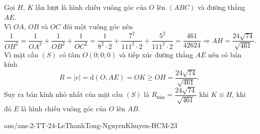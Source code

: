 \begin{ex}
{\noindent Gọi $H$, $K$ lần lượt là hình chiếu vuông góc của $O$ lên $(ABC)$ và đường thẳng $AE$.\\
Vì $OA$, $OB$ và $OC$ đôi một vuông góc nên 
$$ \dfrac{1}{OH^2}=\dfrac{1}{OA^2}+\dfrac{1}{OB^2}+\dfrac{1}{OC^2}=\dfrac{1}{8^2\cdot 2}+\dfrac{7^2}{111^2\cdot 2}+\dfrac{5^2}{111^2\cdot 2}= \dfrac{461}{42624} \Rightarrow AH=\dfrac{24\sqrt{74}}{\sqrt{461}}.$$
Vì mặt cầu $(S)$ có tâm $O(0;0;0)$ và tiếp xúc đường thẳng $AE$ nên có bán kính 
$$ R=|c|=\mathrm{d}(O,AE)=OK \ge OH=\dfrac{24\sqrt{74}}{\sqrt{461}}. $$
Suy ra bán kính nhỏ nhất của mặt cầu $(S)$ là $R_{\min}=\dfrac{24\sqrt{74}}{\sqrt{461}}$ khi $K\equiv H$, khi đó $E$ là hình chiếu vuông góc của $O$ lên $AB$.
}
\end{ex}


\begin{indapan}{10}
	{ans/ans-2-TT-24-LeThanhTong-NguyenKhuyen-HCM-23}
\end{indapan}
